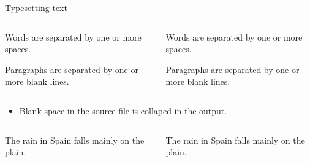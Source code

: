 \documentclass[,aspectratio=43]{beamer}
\newcommand{\VERB}{\Verb[commandchars=\\\{\}]}
\newenvironment{Shaded}{\begin{snugshade}}{\end{snugshade}}
\newcommand{\ExtensionTok}[1]{#1}
\newcommand{\KeywordTok}[1]{\textcolor[rgb]{0.00,0.44,0.13}{\textbf{#1}}}
\newcommand{\NormalTok}[1]{#1}
\providecommand{\tightlist}{%
  \setlength{\itemsep}{0pt}\setlength{\parskip}{0pt}}
\begin{document}
\begin{frame}[fragile]{Typesetting text}
\protect\hypertarget{typesetting-text}{}

\begin{columns}[T]
\begin{column}{0.48\textwidth}
\vspace{-1em}

\begin{Shaded}
\begin{Highlighting}[]
\NormalTok{Words are separated by one}
\NormalTok{or more spaces.}

\NormalTok{Paragraphs are separated by}
\NormalTok{one or more blank lines.}
\end{Highlighting}
\end{Shaded}
\end{column}

\begin{column}{0.48\textwidth}
Words are separated by one or more spaces.

\vspace{1.2em}

Paragraphs are separated by one or more blank lines.
\end{column}
\end{columns}

\vspace{0.5em}

\begin{itemize}
\tightlist
\item
  Blank space in the source file is collaped in the output.
\end{itemize}

\begin{columns}[T]
\begin{column}{0.48\textwidth}
\vspace{-1em}

\begin{Shaded}
\begin{Highlighting}[]
\NormalTok{The      rain    in   Spain}
\NormalTok{falls mainly on the   plain.}
\end{Highlighting}
\end{Shaded}
\end{column}

\begin{column}{0.48\textwidth}
The rain in Spain falls mainly on the plain.
\end{column}
\end{columns}
\end{frame}
\end{document}
